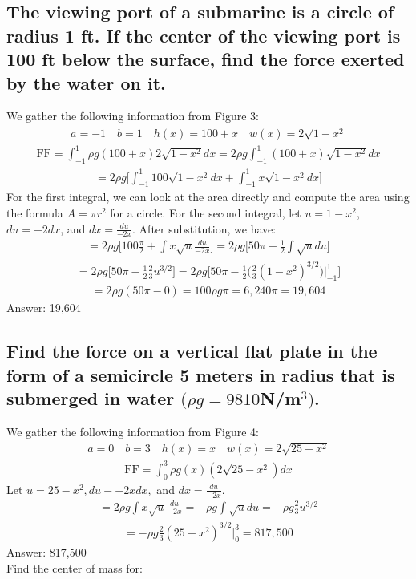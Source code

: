 \documentclass{article}
\begin{document}
\subsection{The viewing port of a submarine is a circle of radius 1 ft. If the center of the viewing port is 100 ft below the surface, find the force exerted by the water on it.}
We gather the following information from Figure 3:
\begin{align*}
	a = -1 \quad b = 1 \quad h(x) = 100 + x \quad w(x) = 2\sqrt{1 - x^2}
\end{align*}
\begin{align*}
	\text{FF} = \int_{-1}^1 {\rho g (100 + x)2\sqrt{1 - x^2}}dx = 2\rho g \int_{-1}^1 {(100 + x) \sqrt{1 - x^2}}dx
\end{align*}
\begin{align*}
	= 2\rho g \bigg[\int_{-1}^1 {100\sqrt{1 - x^2}}dx + \int_{-1}^1 {x\sqrt{1 - x^2}}dx \bigg]
\end{align*}
For the first integral, we can look at the area directly and compute the area using the formula $A = \pi r^2$ for a circle. For the second integral, let $u = 1 - x^2$, $du = -2dx$, and $dx = \frac{du}{-2x}$. After substitution, we have:
\begin{align*}
	= 2\rho g \bigg[ 100 \frac{\pi}{2} + \int {x\sqrt{u} \frac{du}{-2x}} \bigg] = 2\rho g \bigg[ 50\pi - \frac{1}{2} \int {\sqrt{u}du} \bigg]
\end{align*}
\begin{align*}
	= 2\rho g \bigg[ 50\pi - \frac{1}{2} \frac{2}{3} u^{3/2} \bigg] = 2\rho g \bigg[ 50\pi - \frac{1}{2} \bigg( \frac{2}{3} (1 - x^2)^{3/2} \bigg) \bigg|_{-1}^1 \bigg]
\end{align*}
\begin{align*}
	= 2\rho g (50 \pi - 0) = 100 \rho g \pi = 6,240 \pi = 19,604
\end{align*}
Answer: 19,604

\subsection{Find the force on a vertical flat plate in the form of a semicircle 5 meters in radius that is submerged in water $(\rho g = 9810 $N/m$^3)$.}
We gather the following information from Figure 4:
\begin{align*}
	a = 0 \quad b = 3 \quad h(x) = x \quad w(x) = 2\sqrt{25 - x^2}
\end{align*}
\begin{align*}
	\text{FF} = \int_0^3 {\rho g (x) (2\sqrt{25 - x^2})} dx
\end{align*}
Let $u = 25 - x^2, du - -2x dx,$ and $dx = \frac{du}{-2x}$.
\begin{align*}
	= 2\rho g \int {x \sqrt{u} \frac{du}{-2x}} = -\rho g \int{\sqrt{u}du} = - \rho g \frac{2}{3} u^{3/2}
\end{align*}
\begin{align*}
	= -\rho g \frac{2}{3} (25 - x^2)^{3/2} \bigg|_0^3 = 817,500
\end{align*}
Answer: 817,500 \\[10pt]
Find the center of mass for:
\end{document}
